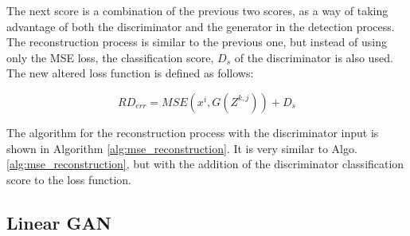 The next score is a combination of the previous two scores, as a way of taking advantage of both the discriminator and the generator in the detection process. The reconstruction process is similar to the previous one, but instead of using only the MSE loss, the classification score, $D_{s}$ of the discriminator is also used. The new altered loss function is defined as follows:

\begin{equation}
    RD_{err} = MSE(x^i, G(Z^{k,j})) + D_{s}
\end{equation}

The algorithm for the reconstruction process with the discriminator input is shown in Algorithm \ref{alg:mse_reconstruction}. It is very similar to Algo. \ref{alg:mse_reconstruction}, but with the addition of the discriminator classification score to the loss function.
\\

\noindent{}

\subsection{Linear GAN}\label{sec:linear_gan}

